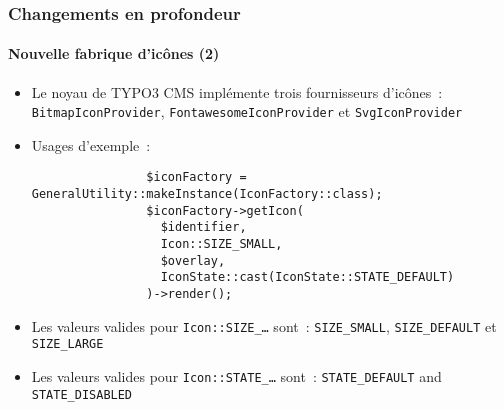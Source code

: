 \begin{frame}[fragile]
	\frametitle{Changements en profondeur}
	\framesubtitle{Nouvelle fabrique d'icônes (2)}

	\lstset{basicstyle=\tiny\ttfamily}

	\begin{itemize}

		\item Le noyau de TYPO3 CMS implémente trois fournisseurs d'icônes~:\newline
			\smaller
				\texttt{BitmapIconProvider}, \texttt{FontawesomeIconProvider} et \texttt{SvgIconProvider}
			\normalsize

		\item Usages d'exemple~:

			\begin{lstlisting}
				$iconFactory = GeneralUtility::makeInstance(IconFactory::class);
				$iconFactory->getIcon(
				  $identifier,
				  Icon::SIZE_SMALL,
				  $overlay,
				  IconState::cast(IconState::STATE_DEFAULT)
				)->render();
			\end{lstlisting}

		\item Les valeurs valides pour \texttt{Icon::SIZE\_…} sont~:\newline
			\small\texttt{SIZE\_SMALL}, \texttt{SIZE\_DEFAULT} et \texttt{SIZE\_LARGE}\normalsize
			\vspace{0.4cm}

		\item Les valeurs valides pour \texttt{Icon::STATE\_…} sont~:\newline
			\small\texttt{STATE\_DEFAULT} and \texttt{STATE\_DISABLED}\normalsize

	\end{itemize}

\end{frame}


